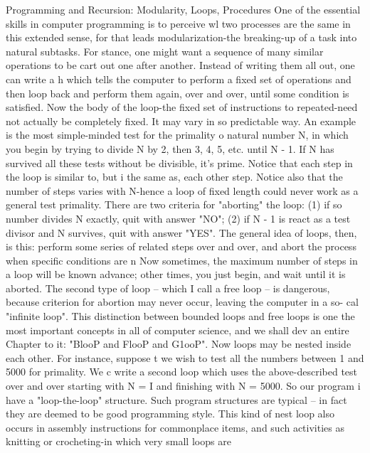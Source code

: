       Programming and Recursion: Modularity, Loops, Procedures
One of the essential skills in computer programming is to perceive wl two processes are
the same in this extended sense, for that leads modularization-the breaking-up of a task
into natural subtasks. For stance, one might want a sequence of many similar operations
to be cart out one after another. Instead of writing them all out, one can write a h which
tells the computer to perform a fixed set of operations and then loop back and perform
them again, over and over, until some condition is satisfied. Now the body of the loop-the
fixed set of instructions to repeated-need not actually be completely fixed. It may vary in
so predictable way.
         An example is the most simple-minded test for the primality o natural number N,
in which you begin by trying to divide N by 2, then 3, 4, 5, etc. until N - 1. If N has
survived all these tests without be divisible, it's prime. Notice that each step in the loop is
similar to, but i the same as, each other step. Notice also that the number of steps varies
with N-hence a loop of fixed length could never work as a general test primality. There
are two criteria for "aborting" the loop: (1) if so number divides N exactly, quit with
answer "NO"; (2) if N - 1 is react as a test divisor and N survives, quit with answer
"YES".
         The general idea of loops, then, is this: perform some series of related steps over
and over, and abort the process when specific conditions are n Now sometimes, the
maximum number of steps in a loop will be known advance; other times, you just begin,
and wait until it is aborted. The second type of loop -- which I call a free loop -- is
dangerous, because criterion for abortion may never occur, leaving the computer in a so-
cal "infinite loop". This distinction between bounded loops and free loops is one the most
important concepts in all of computer science, and we shall dev an entire Chapter to it:
"BlooP and FlooP and G1ooP".
         Now loops may be nested inside each other. For instance, suppose t we wish to
test all the numbers between 1 and 5000 for primality. We c write a second loop which
uses the above-described test over and over starting with N = I and finishing with N =
5000. So our program i have a "loop-the-loop" structure. Such program structures are
typical – in fact they are deemed to be good programming style. This kind of nest loop
also occurs in assembly instructions for commonplace items, and such activities as
knitting or crocheting-in which very small loops are




